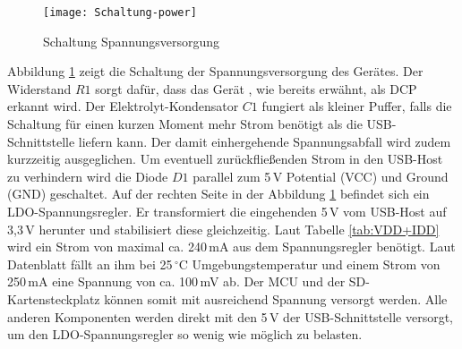 \begin{figure}[h]
	\begin{center}
		\texttt{[image: Schaltung-power]}	
		\caption{Schaltung Spannungsversorgung}
		\label{fig:Schaltung-power}
	\end{center}
\end{figure}
Abbildung \ref{fig:Schaltung-power} zeigt die Schaltung der Spannungsversorgung des Gerätes. Der Widerstand $R1$ sorgt dafür, dass das Gerät , wie bereits erwähnt, als DCP erkannt wird. Der Elektrolyt-Kondensator $C1$ fungiert als kleiner Puffer, falls die Schaltung für einen kurzen Moment mehr Strom benötigt als die USB-Schnittstelle liefern kann. Der damit einhergehende Spannungsabfall wird zudem kurzzeitig ausgeglichen. Um eventuell zurückfließenden Strom in den USB-Host zu verhindern wird die Diode $D1$ parallel zum 5\,V Potential (VCC) und Ground (GND) geschaltet. Auf der rechten Seite in der Abbildung \ref{fig:Schaltung-power} befindet sich ein LDO-Spannungsregler. Er transformiert die eingehenden 5\,V vom USB-Host auf 3,3\,V herunter und stabilisiert diese gleichzeitig. Laut Tabelle \ref{tab:VDD+IDD} wird ein Strom von maximal ca. 240\,mA aus dem Spannungsregler benötigt. Laut Datenblatt fällt an ihm bei 25\,$^{\circ}$C Umgebungstemperatur und einem Strom von 250\,mA eine Spannung von ca. 100\,mV ab. Der MCU und der SD-Kartensteckplatz können somit mit ausreichend Spannung versorgt werden. Alle anderen Komponenten werden direkt mit den 5\,V der USB-Schnittstelle versorgt, um den LDO-Spannungsregler so wenig wie möglich zu belasten.
